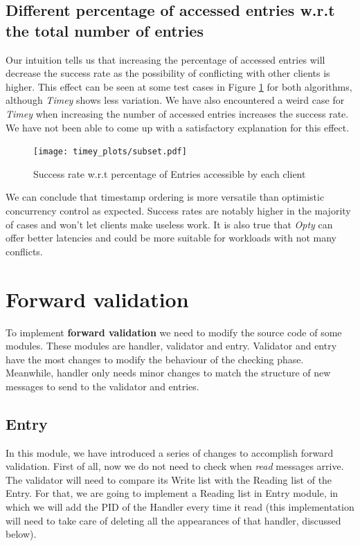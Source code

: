 \documentclass[a4paper, 10pt]{article}
\begin{document}
\clearpage
\subsection{Different percentage of accessed entries w.r.t the total number of entries}

Our intuition tells us that increasing the percentage of accessed entries will decrease the success rate as the possibility of conflicting with other clients is higher. This effect can be seen at some test cases in Figure \ref{timey:subset} for both algorithms, although \textit{Timey} shows less variation. We have also encountered a weird case for \textit{Timey} when increasing the number of accessed entries increases the success rate. We have not been able to come up with a satisfactory explanation for this effect.


\begin{figure}[H]
  \centering
  \texttt{[image: timey\_plots/subset.pdf]}
    \caption{Success rate w.r.t percentage of Entries accessible by each client}
    \label{timey:subset}
\end{figure} 


We can conclude that timestamp ordering is more versatile than optimistic concurrency control as expected. Success rates are notably higher in the majority of cases and won't let clients make useless work. It is also true that \textit{Opty} can offer better latencies and could be more suitable for workloads with not many conflicts.

\clearpage


\section{Forward validation}

To implement \textbf{forward validation} we need to modify the source code of some modules. These modules are handler, validator and entry. Validator and entry have the most changes to modify the behaviour of the checking phase. Meanwhile, handler only needs minor changes to match the structure of new messages to send to the validator and entries.

\subsection{Entry}

In this module, we have introduced a series of changes to accomplish forward validation. First of all, now we do not need to check when \textit{read} messages arrive. The validator will need to compare its Write list with the Reading list of the Entry. For that, we are going to implement a Reading list in Entry module, in which we will add the PID of the Handler every time it read (this implementation will need to take care of deleting all the appearances of that handler, discussed below).
\end{document}
